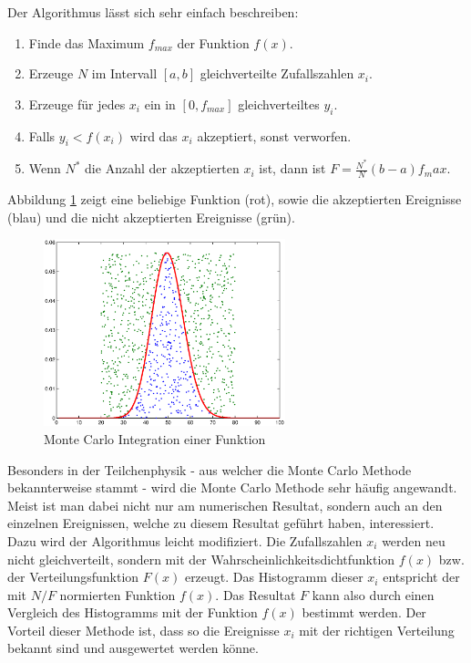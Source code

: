 \documentclass{book}
\begin{document}
\begin{refsection}
Der Algorithmus lässt sich sehr einfach beschreiben:

\begin{enumerate}
	\item Finde das Maximum $f_{max}$ der Funktion $f(x)$.
	\item Erzeuge $N$ im Intervall $[a,b]$ gleichverteilte Zufallszahlen $x_i$.
	\item Erzeuge für jedes $x_i$ ein in $[0,f_{max}]$ gleichverteiltes $y_i$.
	\item Falls $y_i < f(x_i)$ wird das $x_i$ akzeptiert, sonst verworfen.
	\item Wenn $N^*$ die Anzahl der akzeptierten $x_i$ ist, dann ist $F = \frac{N^*}{N}(b-a)f_max$.
\end{enumerate}

Abbildung \ref{fig:integration_histogram} zeigt eine beliebige Funktion (rot), sowie die akzeptierten Ereignisse (blau) und die nicht akzeptierten Ereignisse (grün). \\

\begin{figure}[htbp]
	\centering
	\includegraphics[width=7cm]{images/integration_poisson.eps}
	\caption{Monte Carlo Integration einer Funktion}
	\label{fig:integration_histogram}
\end{figure}

Besonders in der Teilchenphysik - aus welcher die Monte Carlo Methode bekannterweise stammt - wird die Monte Carlo Methode sehr häufig angewandt. Meist ist man dabei nicht nur am numerischen Resultat, sondern auch an den einzelnen Ereignissen, welche zu diesem Resultat geführt haben, interessiert. Dazu wird der Algorithmus leicht modifiziert. Die Zufallszahlen $x_i$ werden neu nicht gleichverteilt, sondern mit der Wahrscheinlichkeitsdichtfunktion $f(x)$ bzw. der Verteilungsfunktion $F(x)$ erzeugt. Das Histogramm dieser $x_i$ entspricht der mit $N/F$ normierten Funktion $f(x)$. Das Resultat $F$ kann also durch einen Vergleich des Histogramms mit der Funktion $f(x)$ bestimmt werden. Der Vorteil dieser Methode ist, dass so die Ereignisse $x_i$ mit der richtigen Verteilung bekannt sind und ausgewertet werden könne.


\end{refsection}
\end{document}

